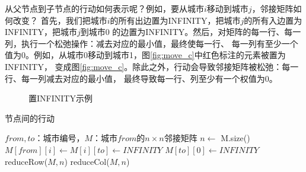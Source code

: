 \documentclass[10pt,letterpaper]{ctexart}
\newcommand{\figref}[1]{图\ref{#1}}
\begin{document}
  \par 从父节点到子节点的行动如何表示呢？例如，要从城市$i$移动到城市$j$，邻接矩阵如何改变？
  首先，我们把城市$i$的所有出边置为INFINITY，把城市$j$的所有入边置为INFINITY，把城市$j$到城市0
  的边置为INFINITY。然后，对矩阵的每一行、每一列，执行一个松弛操作：减去对应的最小值，最终使每一行、
  每一列有至少一个值为0。例如，从城市0移动到城市1，\figref{fig:move_c}中红色标注的元素被置为INFINITY，
  变成\figref{fig:move_c}。除此之外，行动会导致邻接矩阵被松弛：每一行、每一列减去对应的最小值，
  最终导致每一行、列至少有一个权值为0。
  \begin{figure}[H]
    \centering
    \caption{置INFINITY示例}
  \end{figure}
  \begin{algorithm}
      \caption{节点间的行动}
      \begin{algorithmic}[1] %
        \Require $from, to$：城市编号，$M$：城市$from$的$n \times n$邻接矩阵
            \State $n \gets$ M.size()
            \For{$i \in [0, n)$}
              \State $M[from][i] \gets M[i][to] \gets INFINITY$
            \EndFor
            \State $M[to][0] \gets INFINITY$
            \State reduceRow($M, n$)
            \State reduceCol($M, n$)
          \EndFunction
      \end{algorithmic}
  \end{algorithm}
\end{document}
